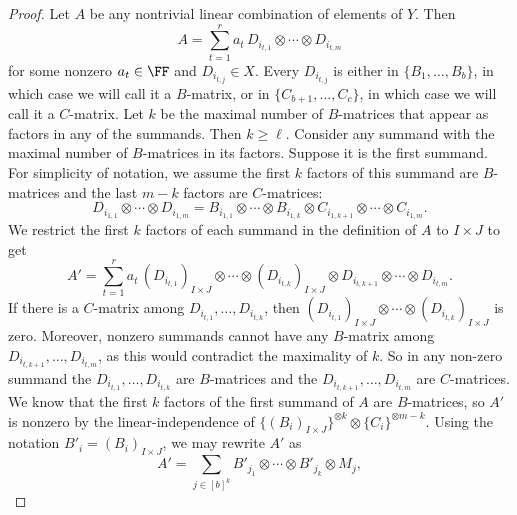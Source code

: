 %
%
%
%
%
%

%
\begin{proof}
    Let $A$ be any nontrivial linear combination of elements of $Y$.
    Then
    \[
    A=\sum_{t=1}^r a_t\, D_{i_{t,1}}\otimes\cdots\otimes D_{i_{t,m}}
    \]
    for some nonzero $a_t \in \FF$ and $D_{i_{t, j}} \in X$. Every $D_{i_{t, j}}$ is either in $\{B_1, \ldots, B_b\}$, in which case we will call it a $B$-matrix, or in $\{C_{b+1}, \ldots, C_c\}$, in which case we will call it a $C$-matrix.
    Let $k$ be the maximal number of $B$-matrices that appear as factors in any of the summands. Then $k\geq \ell$. 
    Consider any summand with the maximal number of $B$-matrices in its factors. Suppose it is the first summand. %
    For simplicity of notation, we assume the first $k$ factors of this summand are $B$-matrices and the last $m - k$ factors are $C$-matrices: %
    \[
    D_{i_{1,1}} \otimes \cdots \otimes D_{i_{1,m}}  = B_{i_{1,1}}\otimes\cdots\otimes B_{i_{1,k}}\otimes C_{i_{1,k+1}}\otimes\cdots\otimes C_{i_{1,m}}.
    \]
    We restrict the first $k$ factors of each summand in the definition of $A$ to $I\times J$ to get %
    \[
    A' = \sum_{t=1}^r a_t \, (D_{i_{t, 1}})_{I\times J} \otimes \cdots \otimes (D_{i_{t, k}})_{I\times J} \otimes D_{i_{t, k+1}} \otimes \cdots \otimes D_{i_{t, m}}.
    \]
    If there is a $C$-matrix among $D_{i_{t, 1}}, \ldots, D_{i_{t, k}}$, then $(D_{i_{t, 1}})_{I\times J} \otimes \cdots \otimes (D_{i_{t, k}})_{I\times J}$ is zero. 
    Moreover, nonzero summands cannot have any $B$-matrix among $D_{i_{t, k+1}}, \ldots, D_{i_{t, m}}$, as this would contradict the maximality of $k$. So in any non-zero summand the $D_{i_{t, 1}}, \ldots, D_{i_{t, k}}$ are $B$-matrices and the $D_{i_{t, k+1}}, \ldots, D_{i_{t, m}}$ are $C$-matrices. %
    We know that the first $k$ factors of the first summand of $A$ are $B$-matrices, so $A'$ is nonzero by the linear-independence of $\{(B_i)_{I\times J}\}^{\otimes k}\otimes\{C_i\}^{\otimes m-k}$.
%
%
%
    Using the notation $B'_i = (B_i)_{I\times J}$, we may rewrite $A'$ as
    \[
    A' = \sum_{{j}\in[b]^k}B'_{j_1}\otimes\cdots\otimes B'_{j_k}\otimes M_j,
\]
\end{proof}
